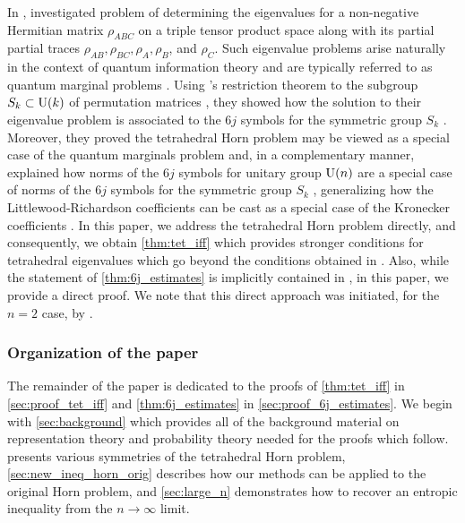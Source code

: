 \documentclass[notitlepage, 11pt, letterpaper]{amsart}
\begin{document}
In \cite{christandl2018recoupling}, \citeauthor{christandl2018recoupling} investigated problem of determining the eigenvalues for a non-negative Hermitian matrix $\rho_{ABC}$ on a triple tensor product space along with its partial partial traces $\rho_{AB}, \rho_{BC}, \rho_{A}, \rho_{B}$, and $\rho_{C}$.
Such eigenvalue problems arise naturally in the context of quantum information theory and are typically referred to as quantum marginal problems \cite{klyachko2004quantum, daftuar2005quantum, christandl2006spectra, christandl2007nonzero, christandl2018recoupling, yu2021complete, fraser2022sufficient}.
Using \citeauthor{nishiyama2000restriction}'s restriction theorem to the subgroup $S_k \subset \operatorname{U}(k)$ of permutation matrices \cite{nishiyama2000restriction}, they showed how the solution to their eigenvalue problem is associated to the $6j$ symbols for the symmetric group $S_k$ \cite{christandl2018recoupling}.
Moreover, they proved the tetrahedral Horn problem may be viewed as a special case of the quantum marginals problem and, in a complementary manner, explained how norms of the $6j$ symbols for unitary group $\operatorname{U}(n)$ are a special case of norms of the $6j$ symbols for the symmetric group $S_k$ \cite{christandl2018recoupling}, generalizing how the Littlewood-Richardson coefficients can be cast as a special case of the Kronecker coefficients \cite{littlewood1958products,murnaghan1955analysis,ikenmeyer2023all}.
In this paper, we address the tetrahedral Horn problem directly, and consequently, we obtain \cref{thm:tet_iff} which provides stronger conditions for tetrahedral eigenvalues which go beyond the conditions obtained in \cite{christandl2018recoupling}.
Also, while the statement of \cref{thm:6j_estimates} is implicitly contained in \cite{christandl2018recoupling}, in this paper, we provide a direct proof.
We note that this direct approach was initiated, for the $n=2$ case, by \citeauthor{backens2010sixjsymbols} \cite{backens2010sixjsymbols}.


\subsubsection*{Organization of the paper}
The remainder of the paper is dedicated to the proofs of \cref{thm:tet_iff} in \cref{sec:proof_tet_iff} and \cref{thm:6j_estimates} in \cref{sec:proof_6j_estimates}.
We begin with \cref{sec:background} which provides all of the background material on representation theory and probability theory needed for the proofs which follow.
 presents various symmetries of the tetrahedral Horn problem,
\cref{sec:new_ineq_horn_orig} describes how our methods can be applied to the original Horn problem, and
\cref{sec:large_n} demonstrates how to recover an entropic inequality from the $n\to\infty$ limit.
\end{document}
